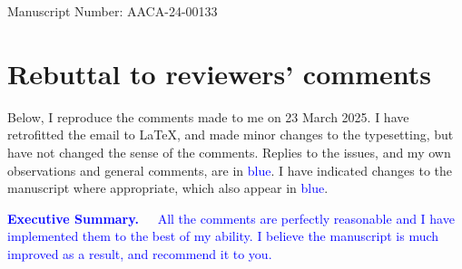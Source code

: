 \documentclass{article}
\begin{document}
Manuscript Number: AACA-24-00133

\section*{Rebuttal to reviewers' comments}

Below, I reproduce the comments made to me on 23 March 2025.  I have
retrofitted the email to \LaTeX, and made minor changes to the
typesetting, but have not changed the sense of the comments.  Replies
to the issues, and my own observations and general comments, are in
\textcolor{blue}{blue}.  I have indicated changes to the manuscript
where appropriate, which also appear in \textcolor{blue}{blue}.\\

\vspace*{1cm}

\noindent\textcolor{blue}{{\bf Executive Summary.\ \ } All the
  comments are perfectly reasonable and I have implemented them to the
  best of my ability.  I believe the manuscript is much improved as a
  result, and recommend it to you.}
\vspace*{1cm}
\end{document}
